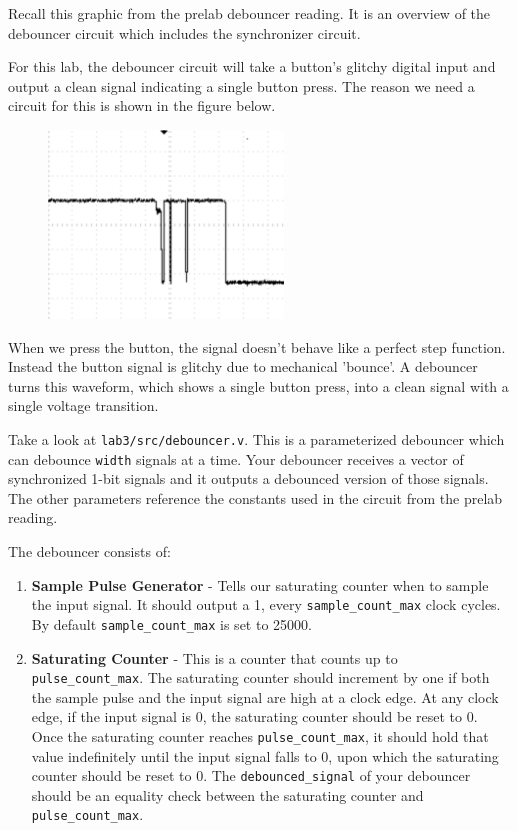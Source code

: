 \documentclass[11pt]{article}
\begin{document}
Recall this graphic from the prelab debouncer reading. It is an overview of the debouncer circuit which includes the synchronizer circuit.

For this lab, the debouncer circuit will take a button's glitchy digital input and output a clean signal indicating a single button press. The reason we need a circuit for this is shown in the figure below.

\begin{figure}[H]
	\centerline{\includegraphics[height=5cm]{images/lab2_fig4.png}}
\end{figure}

When we press the button, the signal doesn't behave like a perfect step function. Instead the button signal is glitchy due to mechanical 'bounce'. A debouncer turns this waveform, which shows a single button press, into a clean signal with a single voltage transition.

Take a look at \verb|lab3/src/debouncer.v|. This is a parameterized debouncer which can debounce \verb|width| signals at a time. Your debouncer receives a vector of synchronized 1-bit signals and it outputs a debounced version of those signals. The other parameters reference the constants used in the circuit from the prelab reading.

The debouncer consists of:

\begin{enumerate}
	\item \textbf{Sample Pulse Generator} - Tells our saturating counter when to sample the input signal. It should output a 1, every \verb|sample_count_max| clock cycles. By default \verb|sample_count_max| is set to 25000.
	
	\item \textbf{Saturating Counter} - This is a counter that counts up to \verb|pulse_count_max|. The saturating counter should increment by one if both the sample pulse and the input signal are high at a clock edge. At any clock edge, if the input signal is 0, the saturating counter should be reset to 0. Once the saturating counter reaches \verb|pulse_count_max|, it should hold that value indefinitely until the input signal falls to 0, upon which the saturating counter should be reset to 0. The \verb|debounced_signal| of your debouncer should be an equality check between the saturating counter and \verb|pulse_count_max|.
\end{enumerate}
\end{document}
